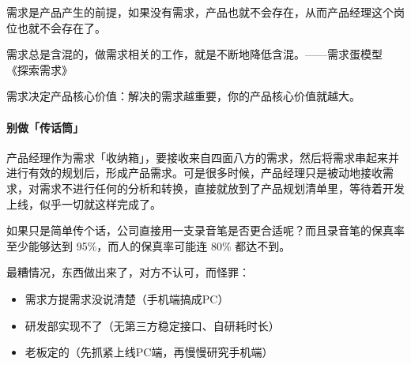 \documentclass[letterpaper,11pt,english]{sphinxmanual}
\begin{document}
需求是产品产生的前提，如果没有需求，产品也就不会存在，从而产品经理这个岗位也就不会存在了。
%
\begin{footnote}[4]\sphinxAtStartFootnote
{}
%
\end{footnote}

需求总是含混的，做需求相关的工作，就是不断地降低含混。——需求蛋模型
《探索需求》
%
\begin{footnote}[5]\sphinxAtStartFootnote
{}
%
\end{footnote}

需求决定产品核心价值：解决的需求越重要，你的产品核心价值就越大。


\paragraph{别做「传话筒」}
\label{\detokenize{chapter_introduction/need:id2}}
产品经理作为需求「收纳箱」，要接收来自四面八方的需求，然后将需求串起来并进行有效的规划后，形成产品需求。可是很多时候，产品经理只是被动地接收需求，对需求不进行任何的分析和转换，直接就放到了产品规划清单里，等待着开发上线，似乎一切就这样完成了。
%
\begin{footnote}[6]\sphinxAtStartFootnote
{}
%
\end{footnote}

如果只是简单传个话，公司直接用一支录音笔是否更合适呢？而且录音笔的保真率至少能够达到
95\%，而人的保真率可能连 80\% 都达不到。

最糟情况，东西做出来了，对方不认可，而怪罪：
\begin{itemize}
\item {} 
需求方提需求没说清楚（手机端搞成PC）

\item {} 
研发部实现不了（无第三方稳定接口、自研耗时长）

\item {} 
老板定的（先抓紧上线PC端，再慢慢研究手机端）

\end{itemize}
\end{document}
